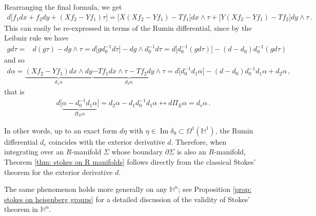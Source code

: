 \documentclass[dvipsnames]{amsart}
\theoremstyle{definition}
\theoremstyle{definition}
\numberwithin{equation}{section}
\renewcommand{\H}{\mathbb{H}}
\begin{document}
Rearranging the final formula, we get
\begin{align*}
    d\big[f_1 dx+f_2dy+(Xf_2-Yf_1)\tau\big]=\big[X(Xf_2-Yf_1)-Tf_1\big]dx\wedge\tau+\big[Y(Xf_2-Yf_1)-Tf_2\big]dy\wedge
    \tau\,.
\end{align*}
This can easily be re-expressed in terms of the Rumin differential, since by the Leibniz rule we have
\begin{align*}
    gd\tau=&d(g\tau)-dg\wedge \tau=d\big[gd_0^{-1}d\tau\big]-dg\wedge d_0^{-1}d\tau=d\big[d_0^{-1}(gd\tau)\big]-(d-d_0)d_0^{-1}(gd\tau)
\end{align*}
and so
\begin{align*}
    d\alpha=\underbrace{(Xf_2-Yf_1)dx\wedge dy}_{d_1\alpha}\underbrace{-Tf_1dx\wedge\tau-Tf_2dy\wedge\tau}_{d_2\alpha}=d\big[d_0^{-1}d_1\alpha\big]-(d-d_0)d_0^{-1}d_1\alpha+d_2\alpha\,,
\end{align*}
that is
\begin{align*}
    d\big[\underbrace{\alpha-d_0^{-1}d_1\alpha}_{\Pi_E\alpha}\big]=d_2\alpha-d_1d_0^{-1}d_1\alpha \longleftrightarrow d\Pi_E\alpha=d_c\alpha\,.
\end{align*}


In other words, up to an exact form \(d\eta\) with \(\eta\in\operatorname{Im}\delta_0\subset\Omega^1(\H^1)\), the Rumin differential \(d_c\) coincides with the exterior derivative \(d\). Therefore, when integrating over an \(R\)-manifold \(\Sigma\) whose boundary \(\partial\Sigma\) is also an \(R\)-manifold, Theorem \ref{thm: stokes on R manifolds} follows directly from the classical Stokes' theorem for the exterior derivative \(d\).

The same phenomenon holds more generally on any \(\H^n\); see Proposition \ref{prop: stokes on heisenberg groups} for a detailed discussion of the validity of Stokes' theorem in \(\H^n\).
\end{document}
